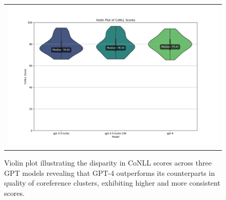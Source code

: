 \begin{figure}[htpb]
  \centering
  \begin{tabular}{c}
  \includegraphics[width=14cm]{images/conll-score.png}
  \end{tabular}
  \caption[Distribution of CoNLL Score]{Violin plot illustrating the disparity in CoNLL scores across three GPT models revealing that GPT-4 outperforms its counterparts in quality of coreference clusters, exhibiting higher and more consistent scores.}\label{fig:violin-conll}
\end{figure}

